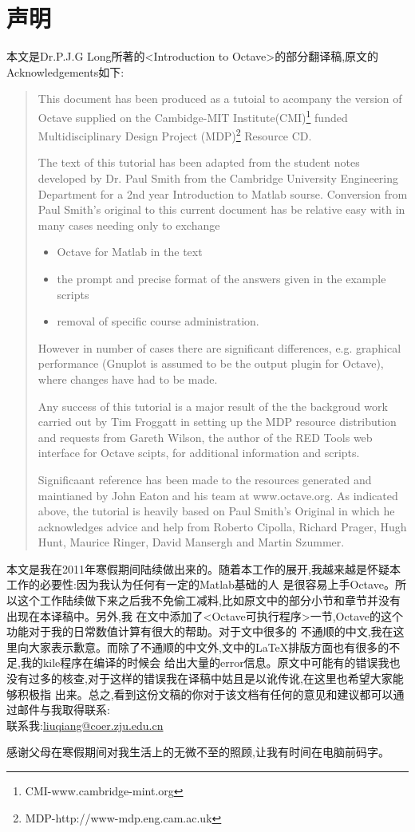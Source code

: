 \documentclass[UTF8,adobefonts]{ctexart}
\begin{document}
\section{声明}
本文是Dr.P.J.G Long所著的<Introduction to Octave>的部分翻译稿,原文的Acknowledgements如下:\\
\begin{quotation}
 This document has been produced as a tutoial to acompany the version of Octave supplied on the Cambidge-MIT
Institute(CMI)\footnote{CMI-www.cambridge-mint.org} funded Multidisciplinary Design Project (MDP)\footnote{MDP-http://www-mdp.eng.cam.ac.uk}
Resource CD.

The text of this tutorial has been adapted from the student notes developed by Dr. Paul Smith from the 
Cambridge University Engineering Department for a 2nd year Introduction to Matlab sourse. Conversion 
from Paul Smith's original to this current document has be relative easy with in many cases needing only
to exchange
\begin{itemize}
 \item Octave for Matlab in the text
 \item the prompt and precise format of the answers given in the example scripts
 \item removal of specific course administration.
\end{itemize}
However in number of cases there are significant differences, e.g. graphical performance (Gnuplot is 
assumed to be the output plugin for Octave), where changes have had to be made.

Any success of this tutorial is a major result of the the backgroud work carried out by Tim Froggatt in 
setting up the MDP resource distribution and requests from Gareth Wilson,  the author of the RED Tools 
web interface for Octave scipts, for additional information and scripts.

Significaant reference has been made to the resources generated and maintianed by John Eaton and his team at 
www.octave.org. As indicated above, the tutorial is heavily based on Paul Smith's Original in which he 
acknowledges advice and help from Roberto Cipolla, Richard Prager, Hugh Hunt, Maurice Ringer, David Mansergh
and Martin Szummer.
\end{quotation} 
\newpage
本文是我在2011年寒假期间陆续做出来的。随着本工作的展开,我越来越是怀疑本工作的必要性:因为我认为任何有一定的Matlab基础的人
是很容易上手Octave。所以这个工作陆续做下来之后我不免偷工减料,比如原文中的部分小节和章节并没有出现在本译稿中。另外,我
在文中添加了<Octave可执行程序>一节,Octave的这个功能对于我的日常数值计算有很大的帮助。对于文中很多的
不通顺的中文,我在这里向大家表示歉意。而除了不通顺的中文外,文中的\LaTeX{}排版方面也有很多的不足,我的kile程序在编译的时候会
给出大量的error信息。原文中可能有的错误我也没有过多的核查,对于这样的错误我在译稿中姑且是以讹传讹,在这里也希望大家能够积极指
出来。总之,看到这份文稿的你对于该文档有任何的意见和建议都可以通过邮件与我取得联系:\\
联系我:\href{mailto:liuqiang@coer.zju.edu.cn}{liuqiang@coer.zju.edu.cn}

感谢父母在寒假期间对我生活上的无微不至的照顾,让我有时间在电脑前码字。
\end{document}
